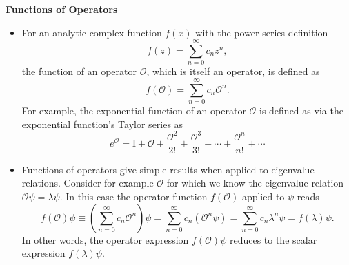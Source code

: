 \documentclass[11pt, a4paper]{article}
\renewcommand{\O}{\mathcal{O}}  %
\newcommand{\p}{\psi}  %
\begin{document}
\textbf{Functions of Operators}
\begin{itemize}
	\item For an analytic complex function $ f(x) $ with the power series definition
	\begin{equation*}
		f(z) = \sum_{n=0}^{\infty}c_{n}z^{n},
	\end{equation*}
    the function of an operator $ \O $, which is itself an operator, is defined as
	\begin{equation*}
		f(\O) = \sum_{n = 0}^{\infty}c_{n} \O^{n}.	
	\end{equation*}
	For example, the exponential function of an operator $ \O $ is defined as via the exponential function's Taylor series as
	\begin{equation*}
		e^{\O} = \mathrm{I} + \O + \frac{\O^{2}}{2!} + \frac{\O^{3}}{3!} + \cdots + \frac{\O^{n}}{n!} + \cdots 
	\end{equation*}
	
	\item Functions of operators give simple results when applied to eigenvalue relations. Consider for example $ \O $ for which we know the eigenvalue relation $ \O \p =  \lambda \p $. In this case the operator function $ f(\O) $ applied to $ \p $ reads
	\begin{equation*}
		f(\O) \psi \equiv \left(\sum_{n = 0}^{\infty}c_{n} \O^{n}\right)\p = \sum_{n=0}^{\infty}c_{n} \left(\O^{n} \p\right) =  \sum_{n=0}^{\infty}c_{n} \lambda^{n} \p = f(\lambda) \p.
	\end{equation*}
	In other words, the operator expression $ f(\O) \psi $ reduces to the scalar expression $ f(\lambda) \p $. 
\end{itemize}
	
\end{document}

